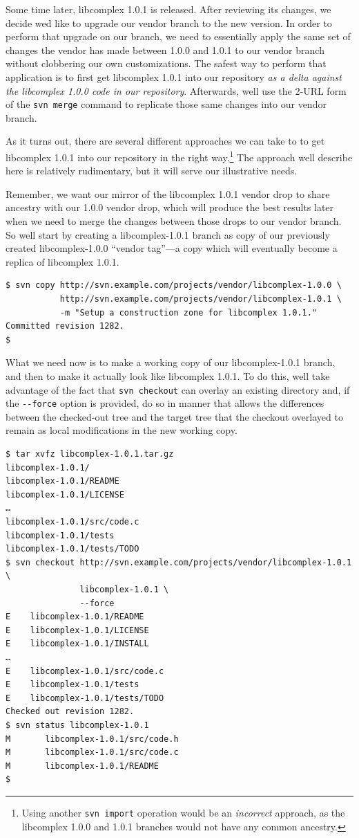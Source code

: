 Some time later, libcomplex 1.0.1 is released. After reviewing its
changes, we decide we\textquotesingle d like to upgrade our vendor
branch to the new version. In order to perform that upgrade on our
branch, we need to essentially apply the same set of changes the vendor
has made between 1.0.0 and 1.0.1 to our vendor branch without clobbering
our own customizations. The safest way to perform that application is to
first get libcomplex 1.0.1 into our repository \emph{as a delta against
the libcomplex 1.0.0 code in our repository}. Afterwards,
we\textquotesingle ll use the 2-URL form of the \texttt{svn\ merge}
command to replicate those same changes into our vendor branch.

As it turns out, there are several different approaches we can take to
to get libcomplex 1.0.1 into our repository in the right way.\footnote{Using
  another \texttt{svn\ import} operation would be an \emph{incorrect}
  approach, as the libcomplex 1.0.0 and 1.0.1 branches would not have
  any common ancestry.} The approach we\textquotesingle ll describe here
is relatively rudimentary, but it will serve our illustrative needs.

Remember, we want our mirror of the libcomplex 1.0.1 vendor drop to
share ancestry with our 1.0.0 vendor drop, which will produce the best
results later when we need to merge the changes between those drops to
our vendor branch. So we\textquotesingle ll start by creating a
libcomplex-1.0.1 branch as copy of our previously created
libcomplex-1.0.0 ``vendor tag''---a copy which will eventually become a
replica of libcomplex 1.0.1.

\begin{verbatim}
$ svn copy http://svn.example.com/projects/vendor/libcomplex-1.0.0 \
           http://svn.example.com/projects/vendor/libcomplex-1.0.1 \
           -m "Setup a construction zone for libcomplex 1.0.1."
Committed revision 1282.
$
\end{verbatim}

What we need now is to make a working copy of our libcomplex-1.0.1
branch, and then to make it actually look like libcomplex 1.0.1. To do
this, we\textquotesingle ll take advantage of the fact that
\texttt{svn\ checkout} can overlay an existing directory and, if the
\texttt{-\/-force} option is provided, do so in manner that allows the
differences between the checked-out tree and the target tree that the
checkout overlayed to remain as local modifications in the new working
copy.

\begin{verbatim}
$ tar xvfz libcomplex-1.0.1.tar.gz
libcomplex-1.0.1/
libcomplex-1.0.1/README
libcomplex-1.0.1/LICENSE
…
libcomplex-1.0.1/src/code.c
libcomplex-1.0.1/tests
libcomplex-1.0.1/tests/TODO
$ svn checkout http://svn.example.com/projects/vendor/libcomplex-1.0.1 \
               libcomplex-1.0.1 \
               --force
E    libcomplex-1.0.1/README
E    libcomplex-1.0.1/LICENSE
E    libcomplex-1.0.1/INSTALL
…
E    libcomplex-1.0.1/src/code.c
E    libcomplex-1.0.1/tests
E    libcomplex-1.0.1/tests/TODO
Checked out revision 1282.
$ svn status libcomplex-1.0.1
M       libcomplex-1.0.1/src/code.h
M       libcomplex-1.0.1/src/code.c
M       libcomplex-1.0.1/README
$
\end{verbatim}


